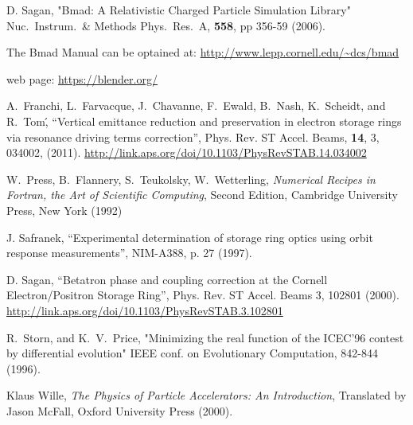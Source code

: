 \begin{thebibliography}{99}

D. Sagan,
"Bmad: A Relativistic Charged Particle Simulation Library"
Nuc.\ Instrum.\ \& Methods Phys.\ Res.\ A, {\bf 558}, pp 356-59 (2006).

The Bmad Manual can be optained at:
\hfill\break
\hspace*{20pt} 
\url{http://www.lepp.cornell.edu/~dcs/bmad}

 web page:
\hfill\break
\hspace*{20pt} 
\url{https://blender.org/}

A.~Franchi, L.~Farvacque, J.~Chavanne, F.~Ewald, B.~Nash, K.~Scheidt, and R.~Tom\',
``Vertical emittance reduction and preservation in electron storage rings via resonance driving terms correction'',
Phys. Rev. ST Accel. Beams,
{\bf 14}, 3, 034002, (2011). 
\hfill\break
\hspace*{20pt}
\url{http://link.aps.org/doi/10.1103/PhysRevSTAB.14.034002}

W.~Press, B.~Flannery, S.~Teukolsky, W.~Wetterling,
{\em Numerical Recipes in Fortran, the Art of Scientific Computing},
Second Edition, Cambridge University Press, New York (1992)

J. Safranek, ``Experimental determination of storage ring optics
using orbit response measurements'', NIM-A388, p. 27 (1997).

D. Sagan,
``Betatron phase and coupling correction at the Cornell Electron/Positron
Storage Ring'', Phys. Rev. ST Accel. Beams 3, 102801 (2000).
\hfill\break
\hspace*{20pt}
\url{http://link.aps.org/doi/10.1103/PhysRevSTAB.3.102801}

R.~Storn, and K.~V.~Price, "Minimizing the real function of the
ICEC'96 contest by differential evolution" IEEE conf. on Evolutionary
Computation, 842-844 (1996).

Klaus Wille, {\em The Physics of Particle Accelerators: An Introduction},
Translated by Jason McFall, Oxford University Press (2000).

\end{thebibliography}
